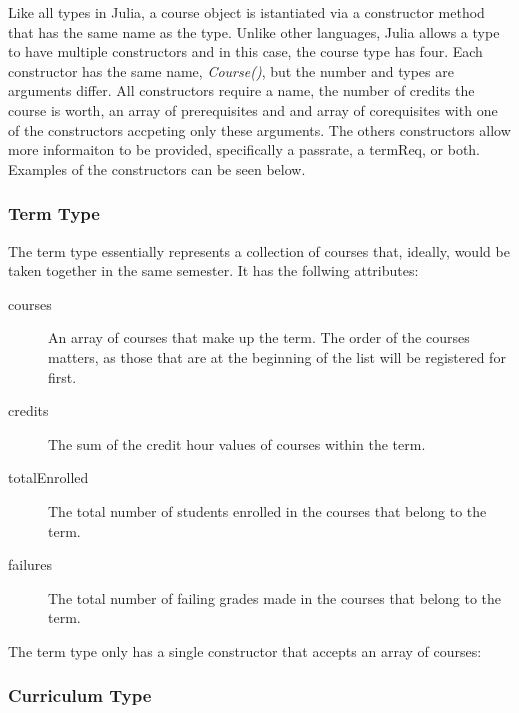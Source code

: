 \documentclass[botnum, fleqn]{unmeethesis}
\begin{document}
Like all types in Julia, a course object is istantiated via a constructor method that has the same name as the type. Unlike other languages, Julia allows a type to have multiple constructors and in this case, the course type has four. Each constructor has the same name, \textit{Course()}, but the number and types are arguments differ. All constructors require a name, the number of credits the course is worth, an array of prerequisites and and array of corequisites with one of the constructors accpeting only these arguments. The others constructors allow more informaiton to be provided, specifically a passrate, a termReq, or both. Examples of the constructors can be seen below.



\subsubsection{Term Type}

The term type essentially represents a collection of courses that, ideally, would be taken together in the same semester. It has the follwing attributes:

\begin{description}
\item [courses] An array of courses that make up the term. The order of the courses matters, as those that are at the beginning of the list will be registered for first.
\item [credits] The sum of the credit hour values of courses within the term.
\item [totalEnrolled] The total number of students enrolled in the courses that belong to the term.
\item [failures] The total number of failing grades made in the courses that belong to the term.
\end{description}

The term type only has a single constructor that accepts an array of courses:



\subsubsection{Curriculum Type}
\end{document}

